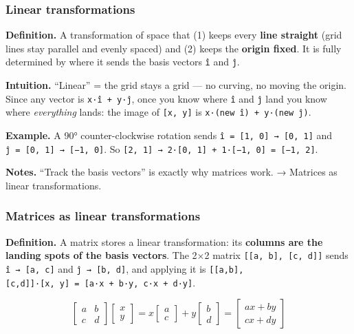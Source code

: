 \documentclass[
  10pt,
  letterpaper,
  onecolumn]{article}
\begin{document}
\hypertarget{linear-transformations}{%
\subsubsection{Linear transformations}\label{linear-transformations}}

\textbf{Definition.} A transformation of space that (1) keeps every
\textbf{line straight} (grid lines stay parallel and evenly spaced) and
(2) keeps the \textbf{origin fixed}. It is fully determined by where it
sends the basis vectors \texttt{î} and \texttt{ĵ}.

\textbf{Intuition.} ``Linear'' = the grid stays a grid --- no curving,
no moving the origin. Since any vector is \texttt{x·î\ +\ y·ĵ}, once you
know where \texttt{î} and \texttt{ĵ} land you know where
\emph{everything} lands: the image of \texttt{{[}x,\ y{]}} is
\texttt{x·(new\ î)\ +\ y·(new\ ĵ)}.

\textbf{Example.} A 90° counter-clockwise rotation sends
\texttt{î\ =\ {[}1,\ 0{]}\ →\ {[}0,\ 1{]}} and
\texttt{ĵ\ =\ {[}0,\ 1{]}\ →\ {[}−1,\ 0{]}}. So
\texttt{{[}2,\ 1{]}\ →\ 2·{[}0,\ 1{]}\ +\ 1·{[}−1,\ 0{]}\ =\ {[}−1,\ 2{]}}.

\textbf{Notes.} ``Track the basis vectors'' is exactly why matrices
work. → Matrices as linear transformations.

\hypertarget{matrices-as-linear-transformations}{%
\subsubsection{Matrices as linear
transformations}\label{matrices-as-linear-transformations}}

\textbf{Definition.} A matrix stores a linear transformation: its
\textbf{columns are the landing spots of the basis vectors}. The 2×2
matrix \texttt{{[}{[}a,\ b{]},\ {[}c,\ d{]}{]}} sends
\texttt{î\ →\ {[}a,\ c{]}} and \texttt{ĵ\ →\ {[}b,\ d{]}}, and applying
it is
\texttt{{[}{[}a,b{]},{[}c,d{]}{]}·{[}x,\ y{]}\ =\ {[}a·x\ +\ b·y,\ c·x\ +\ d·y{]}}.

\begin{equation*}
\begin{bmatrix}a&b\\c&d\end{bmatrix}
\begin{bmatrix}x\\y\end{bmatrix}
=x\begin{bmatrix}a\\c\end{bmatrix}+y\begin{bmatrix}b\\d\end{bmatrix}
=\begin{bmatrix}ax+by\\cx+dy\end{bmatrix}
\end{equation*}
\end{document}
